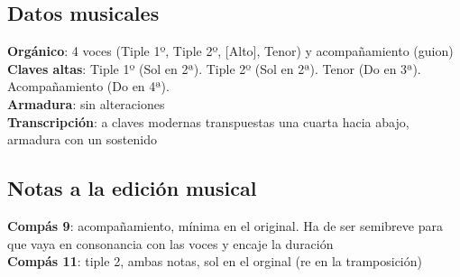 
\subsection*{Datos musicales}
\noindent \textbf{Orgánico}: 4 voces (Tiple 1º, Tiple 2º, [Alto], Tenor) y acompañamiento (guion)\\
\textbf{Claves altas}: Tiple 1º (Sol en 2ª). Tiple 2º (Sol en 2ª). Tenor (Do en 3ª). Acompañamiento (Do en 4ª).\\
\textbf{Armadura}: sin alteraciones\\
\textbf{Transcripción}: a claves modernas transpuestas una cuarta hacia abajo, armadura con un sostenido


\subsection*{Notas a la edición musical}

\noindent \textbf{Compás 9}: acompañamiento, mínima en el original. Ha de ser semibreve para que vaya en consonancia con las voces y encaje la duración\\
\textbf{Compás 11}: tiple 2, ambas notas, sol en el orginal (re en la tramposición)


